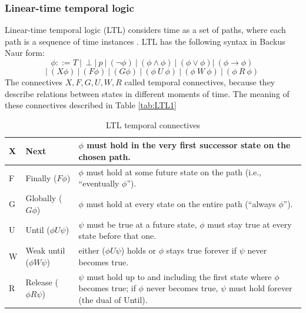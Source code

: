 \subsubsection{Linear-time temporal logic }
Linear-time temporal logic (LTL) considers time as a set of paths, where each path 
is a sequence of time instances \cite{HuthR1}.
LTL has the following syntax in Backus Naur form:
\[ \phi ::= T\ |\  \perp |\  p\ |\  (\neg\phi)\  |\  (\phi \land \phi)\  |\  (\phi \lor \phi) |\ (\phi \rightarrow \phi)\   \]
\[|\   (X \phi)\  |\  (F \phi)\  |\  (G \phi)\  |\  (\phi\ U\ \phi)\  |\  (\phi\ W\ \phi)\  |\  (\phi\ R\ \phi)\ \]
The connectives $X, F, G, U, W, R$ called temporal connectives, because they describe relations between states in different moments of time.
The meaning of these connectives described in Table \ref{tab:LTL1}\\

\begin{center}
 
\begin{table}[h!]   
    \begin{tabular}{| m{0.6cm} | m{3.5cm} | m{11cm} |}
        \hline
        X & Next & $\phi$ must hold in the very first successor state on the chosen path.\\
        \hline
        F & Finally ($F \phi$) & $\phi$ must hold at some future state on the path (i.e., “eventually $\phi$”).\\
        \hline
        G & Globally ($G \phi$) & $\phi$ must hold at every state on the entire path (“always $\phi$”).\\
        \hline
        U & Until ($\phi U \psi$) & $\psi$ must be true at a future state, $\phi$ must stay true at every state before that one.\\
        \hline
        W & Weak until ($\phi W \psi$) & either ($\phi U \psi$) holds or $\phi$ stays true forever if $\psi$ never becomes true.\\
        \hline
        R & Release ($\phi R \psi$) & $\psi$ must hold up to and including the first state where 
        $\phi$ becomes true; if $\phi$ never becomes true, $\psi$ must hold forever (the dual of Until).\\
        \hline
    \end{tabular}
    \caption{LTL temporal connectives}
\end{table}
    \label{tab:LTL1}

\end{center}

